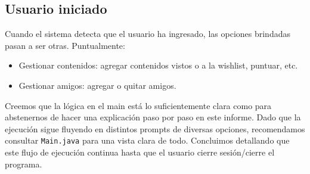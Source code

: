 \subsection{Usuario iniciado}\label{subsec:usuario-iniciado}
Cuando el sistema detecta que el usuario ha ingresado, las opciones brindadas pasan a ser otras.
Puntualmente:
\begin{itemize}
    \item Gestionar contenidos: agregar contenidos vistos o a la wishlist, puntuar, etc.
    \item Gestionar amigos: agregar o quitar amigos.
\end{itemize}
Creemos que la lógica en el main está lo suficientemente clara como para abstenernos de hacer una explicación paso por
paso en este informe.
Dado que la ejecución sigue fluyendo en distintos prompts de diversas opciones, recomendamos consultar \lstinline|Main.java|
para una vista clara de todo.
Concluimos detallando que este flujo de ejecución continua hasta que el usuario cierre sesión/cierre el programa.
